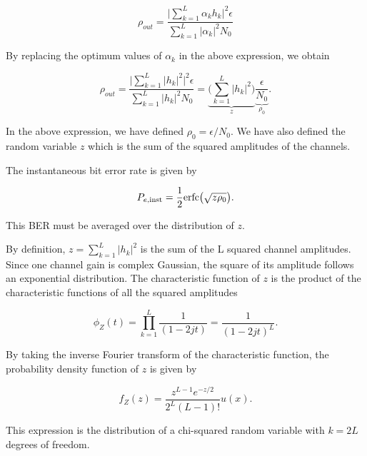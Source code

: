 \documentclass [a4paper, 11pt] {article}
\begin{document}
\begin{solution}
\begin{enumerate}
    \begin{equation}
        \rho_{out} = \dfrac{\Big| \sum_{k=1}^{L}\alpha_kh_k \Big|^2 \epsilon}{\sum_{k=1}^{L} |\alpha_k|^2N_0}
    \end{equation}
    
    By replacing the optimum values of $\alpha_k$ in the above expression, we obtain 
    
        \begin{equation}
        \rho_{out} = \dfrac{\Big| \sum_{k=1}^{L}|h_k|^2 \Big|^2 \epsilon}{\sum_{k=1}^{L} |h_k|^2N_0} = \underbrace{\bigg( \sum_{k=1}^{L} |h_k|^2 \bigg)}_{z} \underbrace{\dfrac{\epsilon}{N_0}}_{\rho_0}.
        \end{equation}
    
    In the above expression, we have defined $\rho_0 = \epsilon/N_0$. We have also defined the random variable $z$ which is the sum of the squared amplitudes of the channels. 
    
    The instantaneous bit error rate is given by 
    
    \begin{equation}
        P_{e,\text{\normalfont inst}}= \frac{1}{2}\text{\normalfont erfc}\big(\sqrt{z \rho_0}\big).
    \end{equation}
    
    This BER must be averaged over the distribution of $z$. 
    
    By definition, $z = \sum_{k=1}^{L} |h_k|^2$ is the sum of the L squared channel amplitudes. Since one channel gain is complex Gaussian, the square of its amplitude follows an exponential distribution. The characteristic function of $z$ is the product of the characteristic functions of all the squared amplitudes
    
    \begin{equation}
        \phi_Z(t) = \prod_{k=1}^{L} \dfrac{1}{(1-2jt)} = \dfrac{1}{(1-2jt)^L}.
    \end{equation}
    
    By taking the inverse Fourier transform of the characteristic function, the probability density function of $z$ is given by 
    
    \begin{equation}
        f_Z(z) = \frac{z^{L-1}e^{-z/2}}{2^L(L-1)!} u(x).
    \end{equation}
    
    This expression is the distribution of a chi-squared random variable with $k=2L$ degrees of freedom. 
    

\end{enumerate}
\end{solution}
\end{document}
